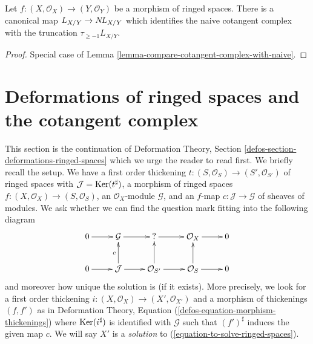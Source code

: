 \begin{lemma}
\label{lemma-compare-cotangent-complex-with-naive-ringed-spaces}
Let $f : (X, \mathcal{O}_X) \to (Y, \mathcal{O}_Y)$ be a morphism of
ringed spaces. There is a canonical map $L_{X/Y} \to \mathop{N\!L}\nolimits_{X/Y}$ which
identifies the naive cotangent complex with the truncation
$\tau_{\geq -1}L_{X/Y}$.
\end{lemma}

\begin{proof}
Special case of Lemma \ref{lemma-compare-cotangent-complex-with-naive}.
\end{proof}






\section{Deformations of ringed spaces and the cotangent complex}
\label{section-deformations-ringed-spaces}

\noindent
This section is the continuation of
Deformation Theory, Section \ref{defos-section-deformations-ringed-spaces}
which we urge the reader to read first. We briefly recall the setup.
We have a first order thickening
$t : (S, \mathcal{O}_S) \to (S', \mathcal{O}_{S'})$ of ringed spaces
with $\mathcal{J} = \mathop{\mathrm{Ker}}(t^\sharp)$, a morphism of ringed spaces
$f : (X, \mathcal{O}_X) \to (S, \mathcal{O}_S)$, an $\mathcal{O}_X$-module
$\mathcal{G}$, and an $f$-map $c : \mathcal{J} \to \mathcal{G}$
of sheaves of modules. We ask whether we can find
the question mark fitting into the following diagram
\begin{equation}
\label{equation-to-solve-ringed-spaces}
\vcenter{
\xymatrix{
0 \ar[r] & \mathcal{G} \ar[r] & {?} \ar[r] & \mathcal{O}_X \ar[r] & 0 \\
0 \ar[r] & \mathcal{J} \ar[u]^c \ar[r] & \mathcal{O}_{S'} \ar[u] \ar[r] &
\mathcal{O}_S \ar[u] \ar[r] & 0
}
}
\end{equation}
and moreover how unique the solution is (if it exists). More precisely,
we look for a first order thickening
$i : (X, \mathcal{O}_X) \to (X', \mathcal{O}_{X'})$
and a morphism of thickenings $(f, f')$ as in
Deformation Theory, Equation (\ref{defos-equation-morphism-thickenings})
where $\mathop{\mathrm{Ker}}(i^\sharp)$ is identified with $\mathcal{G}$
such that $(f')^\sharp$ induces the given map $c$.
We will say $X'$ is a {\it solution} to
(\ref{equation-to-solve-ringed-spaces}).


